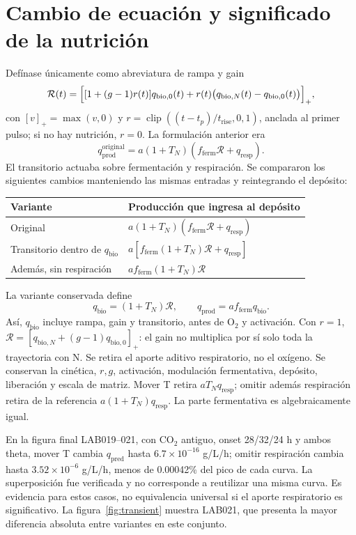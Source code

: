\documentclass[10pt,a4paper]{article}
\newcommand{\qb}{q_{\mathrm{bio}}}
\newcommand{\qp}{q_{\mathrm{prod}}}
\newcommand{\qr}{q_{\mathrm{resp}}}
\newcommand{\qhat}{q_{\mathrm{pred}}}
\newcommand{\ff}{f_{\mathrm{ferm}}}
\newcommand{\clip}{\operatorname{clip}}
\begin{document}
\clearpage
\section{Cambio de ecuación y significado de la nutrición}

Defínase únicamente como abreviatura de rampa y gain
\begin{equation}
\mathcal R(t)=\Bigl[[1+(g-1)r(t)]q_{\mathrm{bio},0}(t)
+r(t)\bigl(q_{\mathrm{bio},N}(t)-q_{\mathrm{bio},0}(t)\bigr)\Bigr]_+,
\label{eq:R}
\end{equation}
con $[v]_+=\max(v,0)$ y
$r=\clip((t-t_p)/t_{\mathrm{rise}},0,1)$, anclada al primer pulso;
si no hay nutrición, $r=0$. La formulación anterior era
\begin{equation}
\qp^{\mathrm{original}}=a(1+T_N)(\ff\mathcal R+\qr).
\label{eq:original}
\end{equation}
El transitorio actuaba sobre fermentación y respiración. Se compararon los
siguientes cambios manteniendo las mismas entradas y reintegrando el depósito:
\begin{center}\small
\begin{tabular}{@{}lp{10.0cm}@{}}
\toprule Variante & Producción que ingresa al depósito\\\midrule
Original & $a(1+T_N)(\ff\mathcal R+\qr)$\\
Transitorio dentro de $\qb$ & $a[\ff(1+T_N)\mathcal R+\qr]$\\
Además, sin respiración & $a\ff(1+T_N)\mathcal R$\\
\bottomrule
\end{tabular}
\end{center}
La variante conservada define
\begin{equation}
\boxed{\qb=(1+T_N)\mathcal R,\qquad \qp=a\ff\qb.}
\label{eq:final}
\end{equation}
Así, $\qb$ incluye rampa, gain y transitorio, antes de O\(_2\) y activación.
Con $r=1$, $\mathcal R=[q_{\mathrm{bio},N}+(g-1)q_{\mathrm{bio},0}]_+$:
el gain no multiplica por sí solo toda la trayectoria con N.
Se retira el aporte aditivo respiratorio, no el oxígeno. Se conservan la
cinética, $r,g$, activación, modulación fermentativa, depósito, liberación y
escala de matriz. Mover T retira $aT_N\qr$; omitir además respiración retira
de la referencia $a(1+T_N)\qr$. La parte fermentativa es algebraicamente igual.

En la figura final LAB019--021, con CO\(_2\) antiguo, onset 28/32/24 h y
ambos theta, mover T cambia $\qhat$ hasta $6.7\times10^{-16}$ g/L/h;
omitir respiración cambia hasta $3.52\times10^{-6}$ g/L/h, menos de
0.00042\% del pico de cada curva. La superposición fue verificada y no
corresponde a reutilizar una misma curva. Es evidencia para estos casos,
no equivalencia universal si el aporte respiratorio es significativo.
La figura~\ref{fig:transient} muestra LAB021, que presenta la mayor
diferencia absoluta entre variantes en este conjunto.
\end{document}
